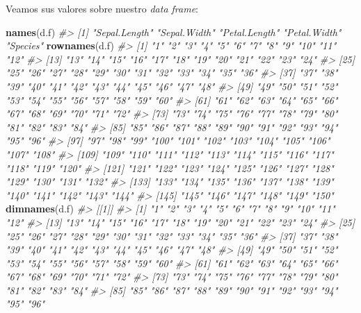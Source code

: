 \documentclass[
]{book}
\newenvironment{Shaded}{\begin{snugshade}}{\end{snugshade}}
\newcommand{\CommentTok}[1]{\textcolor[rgb]{0.56,0.35,0.01}{\textit{#1}}}
\newcommand{\KeywordTok}[1]{\textcolor[rgb]{0.13,0.29,0.53}{\textbf{#1}}}
\newcommand{\NormalTok}[1]{#1}
\theoremstyle{definition}
\theoremstyle{definition}
\theoremstyle{definition}
\theoremstyle{remark}
\begin{document}
Veamos sus valores sobre nuestro \emph{data frame}:

\begin{Shaded}
\begin{Highlighting}[]
\KeywordTok{names}\NormalTok{(d.f)}
\CommentTok{\#\textgreater{} [1] "Sepal.Length" "Sepal.Width"  "Petal.Length" "Petal.Width"  "Species"}
\KeywordTok{rownames}\NormalTok{(d.f)}
\CommentTok{\#\textgreater{}   [1] "1"   "2"   "3"   "4"   "5"   "6"   "7"   "8"   "9"   "10"  "11"  "12" }
\CommentTok{\#\textgreater{}  [13] "13"  "14"  "15"  "16"  "17"  "18"  "19"  "20"  "21"  "22"  "23"  "24" }
\CommentTok{\#\textgreater{}  [25] "25"  "26"  "27"  "28"  "29"  "30"  "31"  "32"  "33"  "34"  "35"  "36" }
\CommentTok{\#\textgreater{}  [37] "37"  "38"  "39"  "40"  "41"  "42"  "43"  "44"  "45"  "46"  "47"  "48" }
\CommentTok{\#\textgreater{}  [49] "49"  "50"  "51"  "52"  "53"  "54"  "55"  "56"  "57"  "58"  "59"  "60" }
\CommentTok{\#\textgreater{}  [61] "61"  "62"  "63"  "64"  "65"  "66"  "67"  "68"  "69"  "70"  "71"  "72" }
\CommentTok{\#\textgreater{}  [73] "73"  "74"  "75"  "76"  "77"  "78"  "79"  "80"  "81"  "82"  "83"  "84" }
\CommentTok{\#\textgreater{}  [85] "85"  "86"  "87"  "88"  "89"  "90"  "91"  "92"  "93"  "94"  "95"  "96" }
\CommentTok{\#\textgreater{}  [97] "97"  "98"  "99"  "100" "101" "102" "103" "104" "105" "106" "107" "108"}
\CommentTok{\#\textgreater{} [109] "109" "110" "111" "112" "113" "114" "115" "116" "117" "118" "119" "120"}
\CommentTok{\#\textgreater{} [121] "121" "122" "123" "124" "125" "126" "127" "128" "129" "130" "131" "132"}
\CommentTok{\#\textgreater{} [133] "133" "134" "135" "136" "137" "138" "139" "140" "141" "142" "143" "144"}
\CommentTok{\#\textgreater{} [145] "145" "146" "147" "148" "149" "150"}
\KeywordTok{dimnames}\NormalTok{(d.f)}
\CommentTok{\#\textgreater{} [[1]]}
\CommentTok{\#\textgreater{}   [1] "1"   "2"   "3"   "4"   "5"   "6"   "7"   "8"   "9"   "10"  "11"  "12" }
\CommentTok{\#\textgreater{}  [13] "13"  "14"  "15"  "16"  "17"  "18"  "19"  "20"  "21"  "22"  "23"  "24" }
\CommentTok{\#\textgreater{}  [25] "25"  "26"  "27"  "28"  "29"  "30"  "31"  "32"  "33"  "34"  "35"  "36" }
\CommentTok{\#\textgreater{}  [37] "37"  "38"  "39"  "40"  "41"  "42"  "43"  "44"  "45"  "46"  "47"  "48" }
\CommentTok{\#\textgreater{}  [49] "49"  "50"  "51"  "52"  "53"  "54"  "55"  "56"  "57"  "58"  "59"  "60" }
\CommentTok{\#\textgreater{}  [61] "61"  "62"  "63"  "64"  "65"  "66"  "67"  "68"  "69"  "70"  "71"  "72" }
\CommentTok{\#\textgreater{}  [73] "73"  "74"  "75"  "76"  "77"  "78"  "79"  "80"  "81"  "82"  "83"  "84" }
\CommentTok{\#\textgreater{}  [85] "85"  "86"  "87"  "88"  "89"  "90"  "91"  "92"  "93"  "94"  "95"  "96" }

\end{Highlighting}
\end{Shaded}
\end{document}
